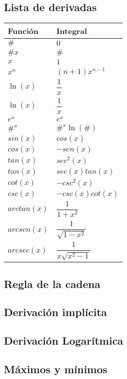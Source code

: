 \subsection{Lista de derivadas}
\begin{table}[H]
	\centering

\begin{tabular}{ll}
	\hline \hline
	Función & Integral\\
	\hline
	$\#$ & $0$\\
	$\#x$ & $\#$\\
	$x$ & $1$\\
	$x^n$ & $(n+1)x^{n-1}$\\
	$\ln(x)$ & $\dfrac{1}{x}$\\
	$\ln(x)$ & $\dfrac{1}{x}$\\
	$e^x$ & $e^x$\\
	$\#^x$ & $\#^x\ln(\#)$\\
	$sin(x)$ & $cos(x)$\\
	$cos(x)$ & $-sen(x)$\\
	$tan(x)$ & $sec^2(x)$\\
	$tan(x)$ & $sec(x)tan(x)$\\
	$cot(x)$ & $-csc^2(x)$\\
	$csc(x)$ & $-csc(x)cot(x)$\\
	$arctan(x)$ & $\dfrac{1}{1+x^2}$\\
	$arcsen(x)$ & $\dfrac{1}{\sqrt{1-x^2}}$\\
	$arcsec(x)$ & $\dfrac{1}{x\sqrt{x^2-1}}$\\
	\hline
\end{tabular}

\end{table}


\subsection{Regla de la cadena}

\subsection{Derivación implícita}

\subsection{Derivación Logarítmica}

\subsection{Máximos y mínimos}

